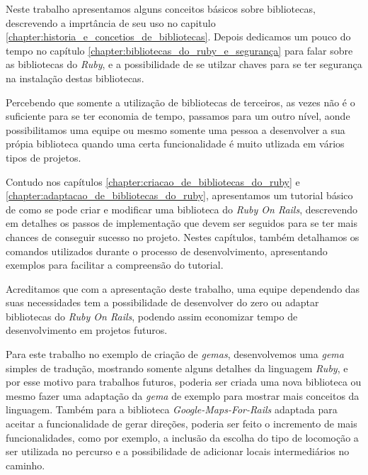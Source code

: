 Neste trabalho apresentamos alguns conceitos básicos sobre bibliotecas, descrevendo a imprtância de seu
uso no capitulo \ref{chapter:historia_e_concetios_de_bibliotecas}. Depois dedicamos um pouco do tempo
no capítulo \ref{chapter:bibliotecas_do_ruby_e_segurança} para falar sobre as bibliotecas do \emph{Ruby}, e a
possibilidade de se utilzar chaves para se ter segurança na instalação destas bibliotecas.

Percebendo que somente a utilização de bibliotecas de terceiros, as vezes não é o suficiente para se
ter economia de tempo, passamos para um outro nível, aonde possibilitamos uma equipe ou mesmo somente
uma pessoa a desenvolver a sua própia biblioteca quando uma certa funcionalidade é muito utlizada em vários
tipos de projetos.

Contudo nos capítulos \ref{chapter:criacao_de_bibliotecas_do_ruby} e
\ref{chapter:adaptacao_de_bibliotecas_do_ruby}, apresentamos um tutorial
básico de como se pode criar e modificar uma biblioteca do \emph{Ruby On Rails}, descrevendo em detalhes os
passos de implementação que devem ser seguidos para se ter mais chances de conseguir sucesso no
projeto. Nestes capítulos, também detalhamos os comandos utilizados durante o processo de
desenvolvimento, apresentando exemplos para facilitar a compreensão do tutorial.

Acreditamos que com a apresentação deste trabalho, uma equipe dependendo das suas necessidades tem
a possibilidade de desenvolver do zero ou adaptar bibliotecas do \emph{Ruby On Rails}, podendo assim
economizar tempo de desenvolvimento em projetos futuros.

Para este trabalho no exemplo de criação de \emph{gemas}, desenvolvemos uma \emph{gema} simples de
tradução, mostrando somente alguns detalhes da linguagem \emph{Ruby}, e por esse motivo para
trabalhos futuros, poderia ser criada uma nova biblioteca ou mesmo fazer uma adaptação da
\emph{gema} de exemplo para mostrar mais conceitos da linguagem. Também para a biblioteca
\emph{Google-Maps-For-Rails} adaptada para aceitar a funcionalidade de gerar direções, poderia ser feito o
incremento de mais funcionalidades, como por exemplo, a inclusão da escolha do tipo de locomoção a ser
utilizada no percurso e a possibilidade de adicionar locais intermediários no caminho.